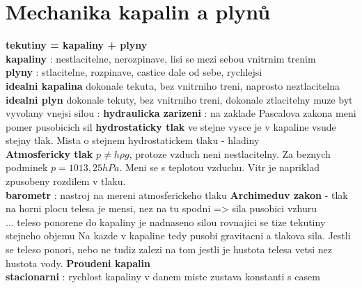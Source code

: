 \documentclass{report}
\begin{document}
\section{Mechanika kapalin a plynů}
\vspace{0.5cm}
\textbf{tekutiny = kapaliny + plyny} \\
\textbf{kapaliny} : nestlacitelne, nerozpinave, lisi se mezi sebou vnitrnim trenim \\
\textbf{plyny} : stlacitelne, rozpinave, castice dale od sebe, rychlejsi\\
\textbf{idealni kapalina} dokonale tekuta, bez vnitrniho treni, naprosto neztlacitelna\\
\textbf{idealni plyn} dokonale tekuty, bez vnitrniho treni, dokonale ztlacitelny
muze byt vyvolany vnejsi silou : 
\textbf{hydraulicka zarizeni} : na zaklade Pascalova zakona meni pomer pusobicich sil 
\textbf{hydrostaticky tlak}
ve stejne vysce je v kapaline vsude stejny tlak. Mista o stejnem hydrostatickem tlaku - hladiny \\
\textbf{Atmosfericky tlak} $p\neq h \rho g$, protoze vzduch neni nestlacitelny. Za beznych podminek $p=1013,25 hPa$. Meni se s teplotou vzduchu. Vitr je napriklad zpusobeny rozdilem v tlaku. \\
\textbf{barometr} : nastroj na mereni atmosferickeho tlaku
\textbf{Archimeduv zakon} - tlak na horni plocu telesa je mensi, nez na tu spodni => sila pusobici vzhuru \\
... teleso ponorene do kapaliny je nadnaseno silou rovnajici se tize tekutiny stejneho objemu
Na kazde v kapaline tedy pusobi gravitacni a tlakova sila. Jestli se teleso ponori, nebo ne tudiz zalezi na tom jestli je hustota telesa vetsi nez hustota vody.
\textbf{Proudeni kapalin} \\
\textbf{stacionarni} : rychlost kapaliny v danem miste zustava konstanti s casem \\
\end{document}
